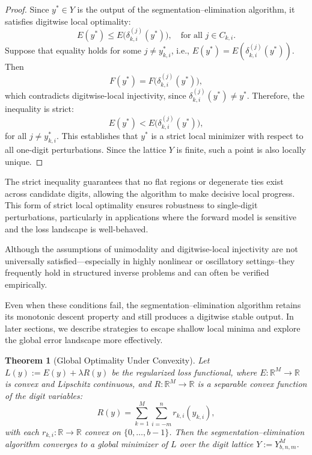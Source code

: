 \documentclass[aps,twocolumn,superscriptaddress,nofootinbib]{revtex4}
\newtheorem{theorem}{Theorem}
\begin{document}
\begin{proof}
Since \( y^* \in Y \) is the output of the segmentation--elimination algorithm, it satisfies digitwise local optimality:
\[
E(y^*) \leq E\big(\delta^{(j)}_{k,i}(y^*)\big), \quad \text{for all } j \in C_{k,i}.
\]
Suppose that equality holds for some \( j \neq y^*_{k,i} \), i.e., \( E(y^*) = E(\delta^{(j)}_{k,i}(y^*)) \). Then
\[
F(y^*) = F\big(\delta^{(j)}_{k,i}(y^*)\big),
\]
which contradicts digitwise-local injectivity, since \( \delta^{(j)}_{k,i}(y^*) \neq y^* \). Therefore, the inequality is strict:
\[
E(y^*) < E\big(\delta^{(j)}_{k,i}(y^*)\big),
\]
for all \( j \neq y^*_{k,i} \). This establishes that \( y^* \) is a strict local minimizer with respect to all one-digit perturbations. Since the lattice \( Y \) is finite, such a point is also locally unique.
\end{proof}

The strict inequality guarantees that no flat regions or degenerate ties exist across candidate digits, allowing the algorithm to make decisive local progress. This form of strict local optimality ensures robustness to single-digit perturbations, particularly in applications where the forward model is sensitive and the loss landscape is well-behaved.

Although the assumptions of unimodality and digitwise-local injectivity are not universally satisfied—especially in highly nonlinear or oscillatory settings--they frequently hold in structured inverse problems and can often be verified empirically.

Even when these conditions fail, the segmentation--elimination algorithm retains its monotonic descent property and still produces a digitwise stable output. In later sections, we describe strategies to escape shallow local minima and explore the global error landscape more effectively.

\begin{theorem}[Global Optimality Under Convexity]
\label{thm:global_optimality_convex}
Let \( L(y) := E(y) + \lambda R(y) \) be the regularized loss functional, where \( E : \mathbb{R}^M \to \mathbb{R} \) is convex and Lipschitz continuous, and \( R : \mathbb{R}^M \to \mathbb{R} \) is a separable convex function of the digit variables:
\[
R(y) = \sum_{k=1}^{M} \sum_{i=-m}^{n} r_{k,i}(y_{k,i}),
\]
with each \( r_{k,i} : \mathbb{R} \to \mathbb{R} \) convex on \( \{0, \dots, b-1\} \). Then the segmentation--elimination algorithm converges to a global minimizer of \( L \) over the digit lattice \( Y := Y_{b,n,m}^M \).

\end{theorem}
\end{document}
